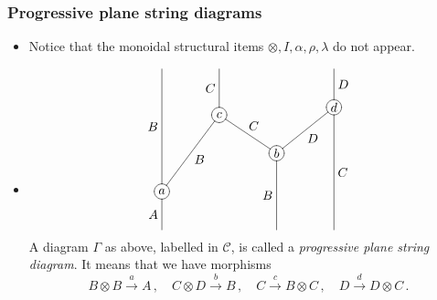 \documentclass{beamer}
\newcommand{\lra}{\longrightarrow}
\def\CC{{\mathscr C}}
\begin{document}
\begin{frame}
  \frametitle{Progressive plane string diagrams}
\begin{itemize}
\item Notice that the monoidal structural items $\otimes, I, \alpha, \rho, \lambda$ do not appear.
\item
\[ 
\xygraph{ !{/r2.5pc/:}
{a} *\xycircle<6pt>{-}="a" [u(2)r(1.5)] {c} *\xycircle<6pt>{-}="c" [d(1)r(1.5)] {b} *\xycircle<6pt>{-}="b" [r(1.5)u(1.2)] {d} *\xycircle<6pt>{-}="d" "a" (-[u(3.2)]^-*{B},-[d]_-*{A},-"c"_-*{B}(-[u(1.2)]^-*{C},-"b"^-*{C}(-[d(2)]_-*{B},-"d"_-*{D}(-[u]_-*{D},-[d(3.2)]^-*{C}))))} 
\]
A diagram $\Gamma$ as above, labelled in $\CC$, is called a \emph{progressive plane string diagram}. 
It means that we have morphisms
\[
B \otimes B \stackrel{a}{\lra} A\,, \quad
C \otimes D \stackrel{b}{\lra} B\,,\quad
C   \stackrel{c}{\lra} B \otimes C\,,\quad
D \stackrel{d}{\lra}  D \otimes C\,.  
\]
\end{itemize}
\end{frame}
\end{document}

